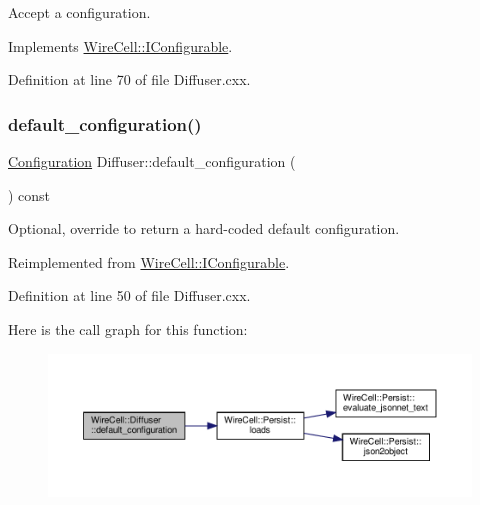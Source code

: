 Accept a configuration. 



Implements \hyperlink{class_wire_cell_1_1_i_configurable_a57ff687923a724093df3de59c6ff237d}{Wire\+Cell\+::\+I\+Configurable}.



Definition at line 70 of file Diffuser.\+cxx.

\mbox{\label{class_wire_cell_1_1_diffuser_a9f2f7a5bae385df91a7a9c1ef035f3a6}} 
\subsubsection{\texorpdfstring{default\+\_\+configuration()}{default\_configuration()}}
{\footnotesize\ttfamily \hyperlink{namespace_wire_cell_a9f705541fc1d46c608b3d32c182333ee}{Configuration} Diffuser\+::default\+\_\+configuration (\begin{DoxyParamCaption}{ }\end{DoxyParamCaption}) const\hspace{0.3cm}{\ttfamily [virtual]}}



Optional, override to return a hard-\/coded default configuration. 



Reimplemented from \hyperlink{class_wire_cell_1_1_i_configurable_a54841b2da3d1ea02189478bff96f7998}{Wire\+Cell\+::\+I\+Configurable}.



Definition at line 50 of file Diffuser.\+cxx.

Here is the call graph for this function\+:
\nopagebreak
\begin{figure}[H]
\begin{center}
\leavevmode
\includegraphics[width=350pt]{class_wire_cell_1_1_diffuser_a9f2f7a5bae385df91a7a9c1ef035f3a6_cgraph}
\end{center}
\end{figure}
\mbox{\label{class_wire_cell_1_1_diffuser_adc579ba4d356101b4b9afdb8422087b6}} 
